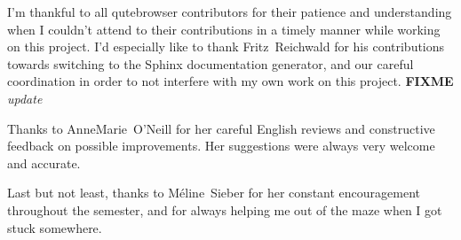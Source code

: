 \documentclass[a4paper,parskip=full]{scrreprt}
\newcommand{\fixme}[1]{\textbf{FIXME} \emph{#1}}
\begin{document}
I'm thankful to all qutebrowser contributors for their patience and
understanding when I couldn't attend to their contributions in a timely manner
while working on this project. I'd especially like to thank Fritz~Reichwald for
his contributions towards switching to the Sphinx documentation generator, and
our careful coordination in order to not interfere with my own work on this
project. \fixme{update}

Thanks to AnneMarie~O'Neill for her careful English reviews and constructive
feedback on possible improvements. Her suggestions were always very welcome and
accurate.

Last but not least, thanks to Méline~Sieber for her constant encouragement
throughout the semester, and for always helping me out of the maze when I got
stuck somewhere.
\end{document}
